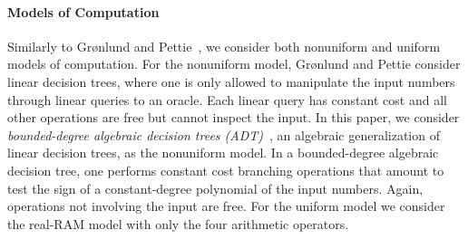 \paragraph{Models of Computation}

Similarly to Gr\o nlund and Pettie~\cite{GP18}, we consider both nonuniform
and uniform models of computation.
%
For the nonuniform model, Gr\o nlund and Pettie consider linear
decision trees, where one is only allowed to manipulate the input numbers
through linear queries to an oracle. Each linear query has constant cost and
all other operations are free but cannot inspect the input.
%
In this paper, we consider
\emph{bounded-degree algebraic decision trees (ADT)}~\cite{R72,Y81,SY82},
an algebraic generalization of linear decision trees,
as the nonuniform model. In a bounded-degree algebraic decision tree, one
performs constant cost branching operations that amount to test the sign of
a constant-degree polynomial of the input numbers. Again,
operations not involving the input are free.
%
For the uniform model we consider the real-RAM model with only the four
arithmetic operators.
